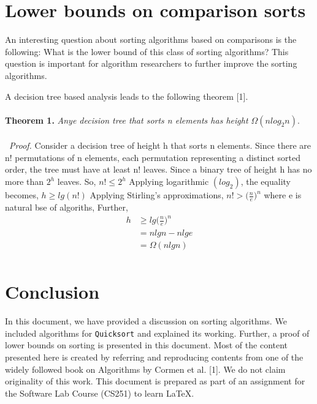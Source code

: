\documentclass[a4paper, 10pt,twocolumn]{article}
\begin{document}
\section{Lower bounds on comparison sorts}
An interesting question about sorting algorithms
based on comparisons is the following: What is
the lower bound of this class of sorting algorithms? This question is important for algorithm
researchers to further improve the sorting algorithms.\par
A decision tree based analysis leads to the following theorem [1].\\\\
\textbf{Theorem 1.} \textit{Anye decision tree that sorts n elements has height $\Omega(n log_2{n}).$}\\\\\
\textit{Proof.} Consider a decision tree of height h that sorts n elements. Since there are n! permutations of n elements, each permutation representing a distinct sorted order, the tree must have at least n! leaves. Since a binary tree of height h has no more than $2^h$ leaves. So,\newline \vspace{2mm}
\hspace{3mm}$n! \leq 2^h$\newline \vspace{2mm}
Applying logarithmic $(log_2)$, the equality becomes,\newline \vspace{2mm}
$h \geq lg(n!)$\newline \vspace{2mm}
Applying Stirling's approximations,\newline \vspace{2mm}
$n! > \big( \frac{n}{e} \big)^n$\newline
where e is natural bse of algoriths, Further, 
\begin{equation*}\begin{split}
    h &\geq lg\bigg( \frac{n}{e} \bigg)^n\\
    &= nlgn - nlge\\
    &=\Omega(nlgn)\\
\end{split}
\end{equation*}

\section{Conclusion}
In this document, we have provided a discussion
on sorting algorithms. We included algorithms for
\texttt{Quicksort} and explained its working. Further, a
proof of lower bounds on sorting is presented in this
document. Most of the content presented here is
created by referring and reproducing contents from
one of the widely followed book on Algorithms by Cormen et al. [1]. We do not claim originality of
this work. This document is prepared as part of an
assignment for the Software Lab Course (CS251) to
learn \LaTeX.
\end{document}

